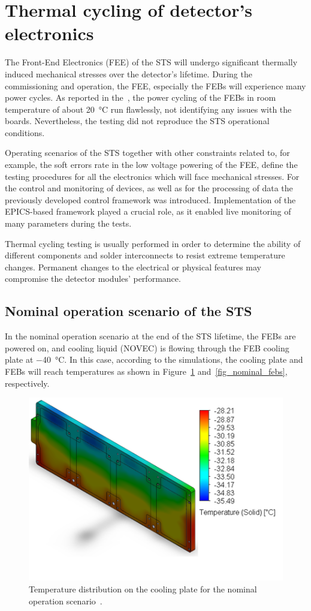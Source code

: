 \newpage
\section{Thermal cycling of detector's electronics}
\label{thermal_cycling}

The Front-End Electronics (\gls{FEE}) of the \gls{STS} will undergo significant thermally induced mechanical stresses over the detector's lifetime. During the commissioning and operation, the \gls{FEE}, especially the \glspl{FEB} will experience many power cycles. As reported in the~\cite{CBM_PR_2021}, the power cycling of the \glspl{FEB} in room temperature of about \SI{20}{\celsius} run flawlessly, not identifying any issues with the boards. Nevertheless, the testing did not reproduce the STS operational conditions.

Operating scenarios of the \gls{STS} together with other constraints related to, for example, the soft errors rate in the low voltage powering of the \gls{FEE}, define the testing procedures for all the electronics which will face mechanical stresses. For the control and monitoring of devices, as well as for the processing of data the previously developed control framework was introduced. Implementation of the EPICS-based framework played a crucial role, as it enabled live monitoring of many parameters during the tests.

Thermal cycling testing is usually performed in order to determine the ability of different components and solder interconnects to resist extreme temperature changes. Permanent changes to the electrical or physical features may compromise the detector modules' performance.

\subsection{Nominal operation scenario of the STS}
\label{nominal}

In the nominal operation scenario at the end of the STS lifetime, the FEBs are powered on, and cooling liquid (NOVEC) is flowing through the \gls{FEB} cooling plate at \SI{-40}{\celsius}. In this case, according to the simulations, the cooling plate and \glspl{FEB} will reach temperatures as shown in Figure~\ref{fig_coolinkg_block_nominal} and~\ref{fig_nominal_febs}, respectively.

    
\begin{figure}[!h]
\centering
\includegraphics[width=0.6\columnwidth]{Chapter4/images/cooling_block_nominal.png}
\caption{Temperature distribution on the cooling plate for the nominal operation scenario~\cite{Agarwal}.}
\label{fig_coolinkg_block_nominal}
\end{figure}

